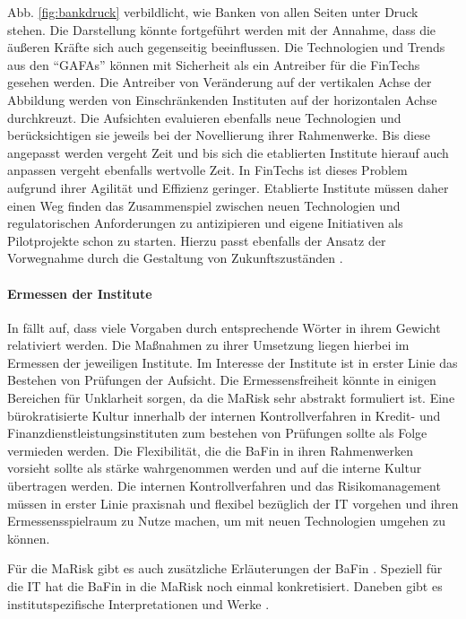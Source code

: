 \medskip
Abb. \ref{fig:bankdruck} verbildlicht, wie Banken von allen Seiten unter Druck stehen. Die Darstellung könnte fortgeführt werden mit der Annahme, dass die äußeren Kräfte sich auch gegenseitig beeinflussen. Die Technologien und Trends aus den \enquote{GAFAs} können mit Sicherheit als ein Antreiber für die FinTechs gesehen werden. Die Antreiber von Veränderung auf der vertikalen Achse der Abbildung werden von Einschränkenden Instituten auf der horizontalen Achse durchkreuzt. Die Aufsichten evaluieren ebenfalls neue Technologien und berücksichtigen sie jeweils bei der Novellierung ihrer Rahmenwerke. Bis diese angepasst werden vergeht Zeit und bis sich die etablierten Institute hierauf auch anpassen vergeht ebenfalls wertvolle Zeit. In FinTechs ist dieses Problem aufgrund ihrer Agilität und Effizienz geringer. Etablierte Institute müssen daher einen Weg finden das Zusammenspiel zwischen neuen Technologien und regulatorischen Anforderungen zu antizipieren und eigene Initiativen als Pilotprojekte schon zu starten. Hierzu passt ebenfalls der Ansatz der Vorwegnahme durch die Gestaltung von Zukunftszuständen \cite{Alt2017}.


\paragraph{Ermessen der Institute}
\label{ermessensfreiheit}
In \cite{MaRisk:2017, BAIT:2018} fällt auf, dass viele Vorgaben durch entsprechende Wörter in ihrem Gewicht relativiert werden. Die Maßnahmen zu ihrer Umsetzung liegen hierbei im Ermessen der jeweiligen Institute. Im Interesse der Institute ist in erster Linie das Bestehen von Prüfungen der Aufsicht. Die Ermessensfreiheit könnte in einigen Bereichen für Unklarheit sorgen, da die \ac{MaRisk} sehr abstrakt formuliert ist.
Eine bürokratisierte Kultur innerhalb der internen Kontrollverfahren in Kredit- und Finanzdienstleistungsinstituten zum bestehen von Prüfungen sollte als Folge vermieden werden. Die Flexibilität, die die BaFin in ihren Rahmenwerken vorsieht \cite{MaRisk:2017} sollte als stärke wahrgenommen werden und auf die interne Kultur übertragen werden. Die internen Kontrollverfahren und das Risikomanagement müssen in erster Linie praxisnah und flexibel bezüglich der IT vorgehen und ihren Ermessensspielraum zu Nutze machen, um mit neuen Technologien umgehen zu können.

Für die \ac{MaRisk} gibt es auch zusätzliche Erläuterungen der BaFin \cite{MaRiskErläuterungen:2017}. Speziell für die IT hat die BaFin in \cite{BAIT:2018} die \ac{MaRisk} noch einmal konkretisiert. Daneben gibt es institutspezifische Interpretationen und Werke \cite{DSGV:2019}.

